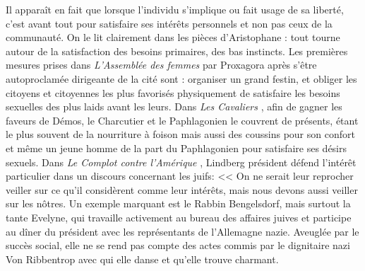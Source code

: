 \documentclass[a4paper]{article}
\newcommand{\cav}{\textit{Les Cavaliers }}
\newcommand{\adf}{\textit{L'Assemblée des femmes }}
\newcommand{\cca}{\textit{Le Complot contre l'Amérique }}
\begin{document}
	Il apparaît en fait que lorsque l'individu s'implique ou fait usage de sa liberté, c'est avant tout pour satisfaire ses intérêts personnels et non pas ceux de la communauté. On le lit clairement dans les pièces d'Aristophane : tout tourne autour de la satisfaction des besoins primaires, des bas instincts. Les premières mesures prises dans \adf par Proxagora après s'être autoproclamée dirigeante de la cité sont : organiser un grand festin, et obliger les citoyens et citoyennes les plus favorisés physiquement de satisfaire les besoins sexuelles des plus laids avant les leurs. Dans \cav, afin de gagner les faveurs de Démos, le Charcutier et le Paphlagonien le couvrent de présents, étant le plus souvent de la nourriture à foison mais aussi des coussins pour son confort et même un jeune homme de la part du Paphlagonien pour satisfaire ses désirs sexuels. Dans \cca, Lindberg président défend l'intérêt particulier dans un discours concernant les juifs: << On ne serait leur reprocher veiller sur ce qu'il considèrent comme leur intérêts, mais nous devons aussi veiller sur les nôtres. Un exemple marquant est le Rabbin Bengelsdorf, mais surtout la tante Evelyne, qui travaille activement au bureau des affaires juives et participe au dîner du président avec les représentants de l'Allemagne nazie. Aveuglée par le succès social, elle ne se rend pas compte des actes commis par le dignitaire nazi Von Ribbentrop avec qui elle danse et qu'elle trouve charmant.\\
\end{document}
